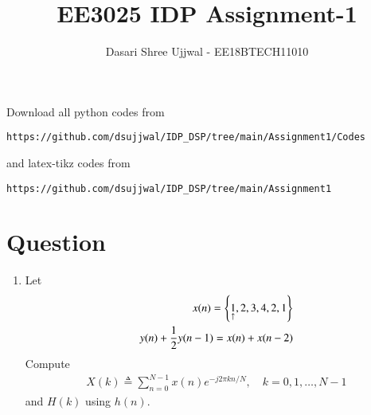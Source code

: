 \documentclass[journal,12pt,twocolumn]{IEEEtran}
\renewcommand\thesection{\arabic{section}}
\begin{document}
     \def\midbox#1{\raisebox{-0.5\baselineskip}[0in][0in]{#1}}
\vspace{3cm}
\title{EE3025 IDP Assignment-1}
\author{Dasari Shree Ujjwal - EE18BTECH11010}
\maketitle
\newpage
\bigskip
\renewcommand{\thefigure}{\theenumi}
\renewcommand{\thetable}{\theenumi}
Download all python codes from 
\begin{lstlisting}
https://github.com/dsujjwal/IDP_DSP/tree/main/Assignment1/Codes
\end{lstlisting}
%
and latex-tikz codes from 
%
\begin{lstlisting}
https://github.com/dsujjwal/IDP_DSP/tree/main/Assignment1
\end{lstlisting}
\section{Question}
\begin{enumerate}[label=\thesection.\arabic*.,ref=\thesection.\theenumi]
    
\item Let
\begin{align}
    x(n) = \left\{\underset{\uparrow}{1},2,3,4,2,1\right\} \\
    y(n) + \frac{1}{2}y(n-1) = x(n) + x(n-2) \label{eq:1.0.2}
\end{align}
Compute
\begin{align}
    X(k) \triangleq \sum_{n=0}^{N-1}x(n)e^{-j2\pi kn/N},\quad k=0,1, \ldots, N-1
\end{align}
and $H(k)$ using $h(n)$.
\end{enumerate}
\end{document}
